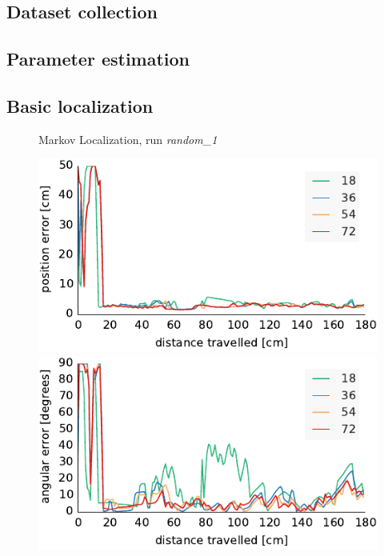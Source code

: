 \documentclass[letterpaper, 10pt, conference]{ieeeconf}
\begin{document}
\subsection{Dataset collection}


\subsection{Parameter estimation}
\label{sec:mle}


\subsection{Basic localization}

\begin{figure}

\begin{center}
Markov Localization, run \emph{random\_1}
\end{center}
\includegraphics{ml-whole_random_1-xy}\hfill
\includegraphics{ml-whole_random_1-theta}


\end{figure}
\end{document}
